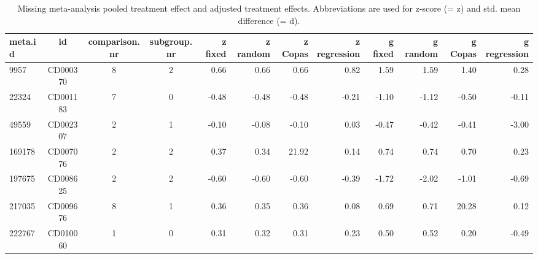 \documentclass[11pt,a4paper,twoside]{book}\usepackage[]{graphicx}\usepackage[]{color}
\begin{document}
\begin{table}[ht]
\centering
\begingroup\tiny
\begin{tabular}{lcccrrrrrrrr}
  \hline
meta.id & id & comparison.nr & subgroup.nr & z fixed & z random & z Copas & z regression & g fixed & g random & g Copas & g regression \\ 
  \hline
9957 & CD000370 & 8 & 2 & 0.66 & 0.66 & 0.66 & 0.82 & 1.59 & 1.59 & 1.40 & 0.28 \\ 
  22324 & CD001183 & 7 & 0 & -0.48 & -0.48 & -0.48 & -0.21 & -1.10 & -1.12 & -0.50 & -0.11 \\ 
  49559 & CD002307 & 2 & 1 & -0.10 & -0.08 & -0.10 & 0.03 & -0.47 & -0.42 & -0.41 & -3.00 \\ 
  169178 & CD007076 & 2 & 2 & 0.37 & 0.34 & 21.92 & 0.14 & 0.74 & 0.74 & 0.70 & 0.23 \\ 
  197675 & CD008625 & 2 & 2 & -0.60 & -0.60 & -0.60 & -0.39 & -1.72 & -2.02 & -1.01 & -0.69 \\ 
  217035 & CD009676 & 8 & 1 & 0.36 & 0.35 & 0.36 & 0.08 & 0.69 & 0.71 & 20.28 & 0.12 \\ 
  222767 & CD010060 & 1 & 0 & 0.31 & 0.32 & 0.31 & 0.23 & 0.50 & 0.52 & 0.20 & -0.49 \\ 
   \hline
\end{tabular}
\endgroup
\caption{Missing meta-analysis pooled treatment effect and adjusted treatment effects. Abbreviations are used for z-score (= z) and std. mean difference (= d).} 
\label{missing.differences}
\end{table}
\end{document}
